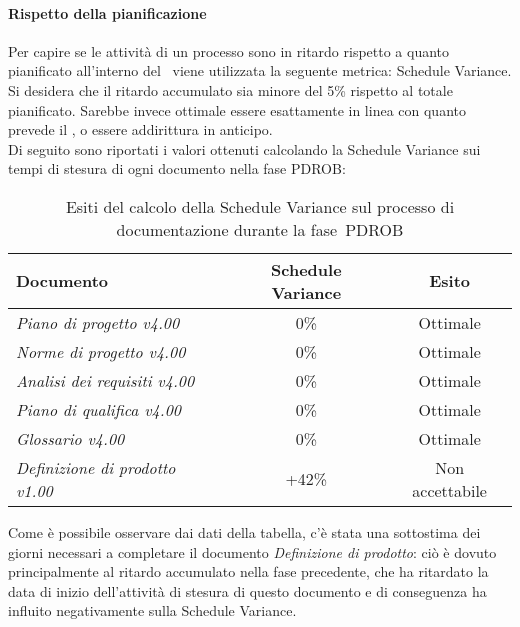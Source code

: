 \documentclass[../PianoDiQualifica.tex]{subfiles}
\begin{document}
\begin{appendices}
			\paragraph{Rispetto della pianificazione}
			Per capire se le attività di un processo sono in ritardo rispetto a quanto pianificato all'interno del \pianodiprogetto\ viene utilizzata la seguente metrica: Schedule Variance.\\
			Si desidera che il ritardo accumulato sia minore del 5\% rispetto al totale pianificato. Sarebbe invece ottimale essere esattamente in linea con quanto prevede il \pianodiprogetto, o essere addirittura in anticipo.\\
			Di seguito sono riportati i valori ottenuti calcolando la Schedule Variance sui tempi di stesura di ogni documento nella fase PDROB:
			\begin{table}[H]
				\centering
				\begin{tabular}{l * {2}{c}}
					\toprule
					\textbf{Documento} & \textbf{Schedule Variance} & \textbf{Esito} \\
					\midrule
					\textit{Piano di progetto v4.00} & 0\% &  Ottimale \\
					\textit{Norme di progetto v4.00} & 0\% & Ottimale \\
					\textit{Analisi dei requisiti v4.00} & 0\% & Ottimale \\
					\textit{Piano di qualifica v4.00} & 0\% & Ottimale \\
					\textit{Glossario v4.00} & 0\% & Ottimale \\
					\textit{Definizione di prodotto v1.00} & +42\% & Non accettabile \\
					\bottomrule
				\end{tabular}
				\caption{Esiti del calcolo della Schedule Variance sul processo di documentazione durante la fase\g\ PDROB}
				Come è possibile osservare dai dati della tabella, c'è stata una sottostima dei giorni necessari a completare il documento \textit{Definizione di prodotto}: ciò è dovuto principalmente al ritardo accumulato nella fase precedente, che ha ritardato la data di inizio dell'attività di stesura di questo documento e di conseguenza ha influito negativamente sulla Schedule Variance.
				\label{tab:esiti_schedule_variance}
			\end{table}
			

\end{appendices}
\end{document}
